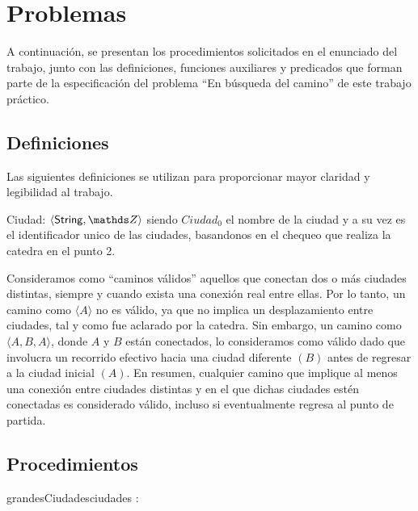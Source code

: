 \documentclass[10pt,a4paper]{article}
\newcommand{\ciudad}{\ensuremath{\langle \mathsf{String} , \ent \rangle}}
\begin{document}
\maketitle

\section{Problemas}
A continuación, se presentan los procedimientos solicitados en el enunciado del trabajo, junto con las definiciones, funciones auxiliares y predicados que forman parte de la especificación del problema ``En búsqueda del camino'' de este trabajo práctico.

\subsection{Definiciones}
Las siguientes definiciones se utilizan para proporcionar mayor claridad y legibilidad al trabajo.
\medskip

Ciudad:  \ciudad \; siendo $Ciudad_0$ el nombre de la ciudad y a su vez es el identificador unico de las ciudades, basandonos en el chequeo que realiza la catedra en el punto 2.
\medskip

Consideramos como ``caminos válidos'' aquellos que conectan dos o más ciudades distintas, siempre y cuando exista una conexión real entre ellas. Por lo tanto, un camino como $\langle A \rangle$ no es válido, ya que no implica un desplazamiento entre ciudades, tal y como fue aclarado por la catedra. Sin embargo, un camino como $\langle A, B, A \rangle$, donde $A$ y $B$ están conectados, lo consideramos como válido dado que involucra un recorrido efectivo hacia una ciudad diferente $(B)$ antes de regresar a la ciudad inicial $(A)$. En resumen, cualquier camino que implique al menos una conexión entre ciudades distintas y en el que dichas ciudades estén conectadas es considerado válido, incluso si eventualmente regresa al punto de partida.

\subsection{Procedimientos}


\begin{proc}{grandesCiudades}{\In ciudades : }{ }
\end{proc}
\end{document}
